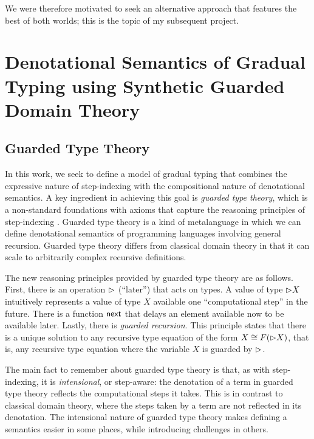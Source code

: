 \documentclass{article}
\theoremstyle{definition}
\theoremstyle{remark}
\begin{document}
We were therefore motivated to seek an alternative approach that features the
best of both worlds; this is the topic of my subsequent project.

\section{Denotational Semantics of Gradual Typing using Synthetic Guarded Domain Theory}

\subsection{Guarded Type Theory}

In this work, we seek to define a model of gradual typing that combines the
expressive nature of step-indexing with the compositional nature of denotational
semantics.
%
A key ingredient in achieving this goal is \emph{guarded type theory}, which is
a non-standard foundations with axioms that capture the reasoning principles of
step-indexing \cite{birkedal-mogelberg-schwinghammer-stovring2011,
kristensen-mogelberg-vezzosi2022}. Guarded type theory is a kind of metalanguage
in which we can define denotational semantics of programming languages involving
general recursion. Guarded type theory differs from classical domain theory in
that it can scale to arbitrarily complex recursive definitions.

The new reasoning principles provided by guarded type theory are as follows.
First, there is an operation ${\vartriangleright}$ (``later'') that acts on types. A value of
type ${\vartriangleright} X$ intuitively represents a value of type $X$ available one
``computational step'' in the future. There is a function $\mathsf{next}$ that delays an
element available now to be available later. Lastly, there is \emph{guarded
recursion}. This principle states that there is a unique solution to any
recursive type equation of the form $X \cong F({\vartriangleright} X)$, that is, any
recursive type equation where the variable $X$ is guarded by ${\vartriangleright}$.

The main fact to remember about guarded type theory is that, as with
step-indexing, it is \emph{intensional}, or step-aware: the denotation of a term
in guarded type theory reflects the computational steps it takes. This is in
contrast to classical domain theory, where the steps taken by a term are not
reflected in its denotation. The intensional nature of guarded type theory makes
defining a semantics easier in some places, while introducing challenges in
others.
\end{document}
